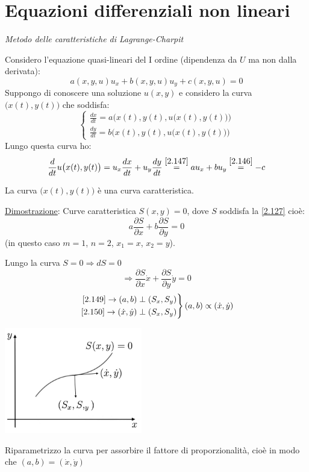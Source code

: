 \documentclass[a4paper,11pt]{report}
\begin{document}
\section{Equazioni differenziali non lineari}

\emph{Metodo delle caratteristiche di Lagrange-Charpit}

Considero l'equazione quasi-lineari del I ordine (dipendenza da $U$ ma non dalla derivata):
\begin{equation}
a(x,y,u)u_x + b(x,y,u)u_y + c(x,y,u)=0 
\label{2.146}
\end{equation}
Suppongo di conoscere una soluzione $u(x,y)$ e considero la curva $\big(x(t),y(t)\big)$ che soddisfa:
\begin{equation}
\begin{cases}
\frac{dx}{dt}=a \big(x(t),y(t),u \big(x(t),y(t) \big) \big) \\
\frac{dy}{dt}=b \big(x(t),y(t),u \big(x(t),y(t) \big) \big)
\end{cases}
\label{2.147}
\end{equation}
Lungo questa curva ho: 
\begin{equation}
\frac{d}{dt}u\big(x(t),y(t)\big)=u_x \frac{dx}{dt} + u_y\frac{dy}{dt}\overset{\eqref{2.147}}{=}au_x + bu_y \overset{\eqref{2.146}}{=}-c
\label{2.148}
\end{equation}

\medskip

La curva $\big(x(t),y(t)\big)$ \`e una curva caratteristica.

\underline{Dimostrazione}: Curve caratteristica $S(x,y)=0$, dove $S$ soddisfa la \eqref{2.127} cio\`e:
\begin{equation}
a\frac{\partial S}{\partial x} + b\frac{\partial S}{\partial y}=0
\label{2.149}
\end{equation}
(in questo caso $m=1$, $n=2$, $x_1=x$, $x_2=y$).

Lungo la curva $S=0 \Rightarrow dS=0 $
\begin{equation}
\Rightarrow \frac{\partial S}{\partial x}\dot{x}+\frac{\partial S}{\partial y}\dot{y} =0
\label{2.150}
\end{equation}
\[
\left.
\begin{aligned}
\eqref{2.149} \rightarrow (a,b) \perp (S_x,S_y)\\
\eqref{2.150} \rightarrow (\dot{x},\dot{y}) \perp (S_x,S_y)\\
\end{aligned}
\right\}(a,b)\propto (\dot{x},\dot{y})
\]
\begin{center}
\includegraphics[width=0.45\textwidth]{immagini/caratteristica}
\end{center}
Riparametrizzo la curva per assorbire il fattore di proporzionalit\`a, cio\`e in modo che $(a,b)=(\dot{x},\dot{y})$ 
\end{document}
